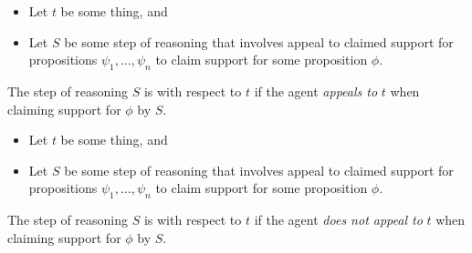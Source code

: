 \begin{note}
  \begin{definition}[\ur{}]
    \vspace{-\baselineskip}
    \begin{itemize}
    \item Let \(t\) be some thing, and
    \item Let \(S\) be some step of reasoning that involves appeal to claimed support for propositions \(\psi_{1},\dots,\psi_{n}\) to claim support for some proposition \(\phi\).
    \end{itemize}

    The step of reasoning \(S\) is \ur{} with respect to \(t\) if the agent \emph{appeals to} \(t\) when claiming support for \(\phi\) by \(S\).
  \end{definition}

  \begin{definition}[\nr{}]
    \vspace{-\baselineskip}
    \begin{itemize}
    \item Let \(t\) be some thing, and
    \item Let \(S\) be some step of reasoning that involves appeal to claimed support for propositions \(\psi_{1},\dots,\psi_{n}\) to claim support for some proposition \(\phi\).
    \end{itemize}

    The step of reasoning \(S\) is \nr{} with respect to \(t\) if the agent \emph{does not appeal to} \(t\) when claiming support for \(\phi\) by \(S\).
  \end{definition}
\end{note}

